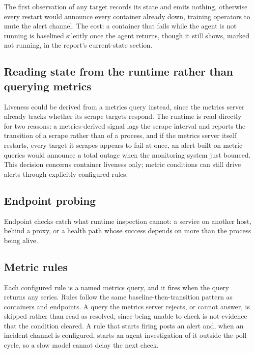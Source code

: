 \documentclass[11pt,a4paper]{article}
\begin{document}
The first observation of any target records its state and emits nothing, otherwise
every restart would announce every container already down, training operators to
mute the alert channel. The cost: a container that fails while the agent is not
running is baselined silently once the agent returns, though it still shows, marked
not running, in the report's current-state section.

\subsection{Reading state from the runtime rather than querying metrics}
\label{sec:socket-vs-query}

Liveness could be derived from a metrics query instead, since the metrics server
already tracks whether its scrape targets respond. The runtime is read directly for
two reasons: a metrics-derived signal lags the scrape interval and reports the
transition of a scrape rather than of a process, and if the metrics server itself
restarts, every target it scrapes appears to fail at once, an alert built on metric
queries would announce a total outage when the monitoring system just bounced.
This decision concerns container liveness only; metric conditions can still drive
alerts through explicitly configured rules.

\subsection{Endpoint probing}

Endpoint checks catch what runtime inspection cannot: a service on another host,
behind a proxy, or a health path whose success depends on more than the process
being alive.

\subsection{Metric rules}

Each configured rule is a named metrics query, and it fires when the query returns
any series. Rules follow the same baseline-then-transition pattern as containers and
endpoints. A query the metrics server rejects, or cannot answer, is skipped rather
than read as resolved, since being unable to check is not evidence that the
condition cleared. A rule that starts firing posts an alert and, when an incident
channel is configured, starts an agent investigation of it outside the poll cycle,
so a slow model cannot delay the next check.
\end{document}
